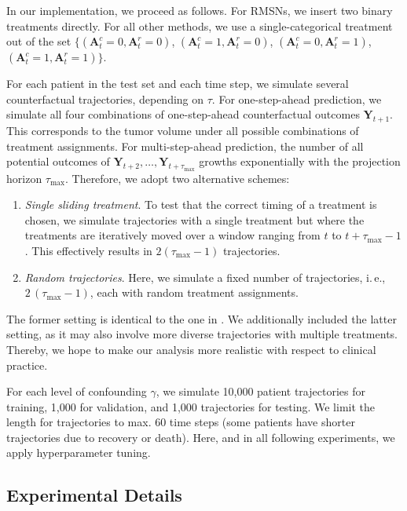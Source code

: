 \documentclass{article}
\newcommand\ie{i.\,e.\xspace}
\theoremstyle{plain}
\theoremstyle{definition}
\theoremstyle{remark}
\begin{document}
In our implementation, we proceed as follows. For RMSNs, we insert two binary treatments directly. For all other methods, we use a single-categorical treatment out of the set $\{(\mathbf{A}^c_t=0, \mathbf{A}^r_t=0)$, $(\mathbf{A}^c_t=1, \mathbf{A}^r_t=0)$, $(\mathbf{A}^c_t=0, \mathbf{A}^r_t=1)$, $(\mathbf{A}^c_t=1, \mathbf{A}^r_t=1 )\}$.

For each patient in the test set and each time step, we simulate several counterfactual trajectories, depending on $\tau$. For one-step-ahead prediction, we simulate all four combinations of one-step-ahead counterfactual outcomes $\mathbf{Y}_{t+1}$. This corresponds to the tumor volume under all possible combinations of treatment assignments. For multi-step-ahead prediction, the number of all potential outcomes of $\mathbf{Y}_{t+2}, \dots, \mathbf{Y}_{t+\tau_{\text{max}}}$ growths exponentially with the projection horizon $\tau_{\text{max}}$. Therefore, we adopt two alternative schemes:
\begin{enumerate}
\item \emph{Single sliding treatment}. To test that the correct timing of a treatment is chosen, we simulate trajectories with a single treatment but where the treatments are iteratively moved over a window ranging from $t$ to $t + \tau_{\text{max}} - 1$. This effectively results in $2(\tau_{\text{max}} - 1)$ trajectories. 
\item \emph{Random trajectories}. Here, we simulate a fixed number of trajectories, \ie, $2\,(\tau_{\text{max}} - 1)$, each with random treatment assignments. 
\end{enumerate} 
The former setting is identical to the one in \cite{bica2020estimating}. We additionally included the latter setting, as it may also involve more diverse trajectories with multiple treatments. Thereby, we hope to make our analysis more realistic with respect to clinical practice. 

For each level of confounding $\gamma$, we simulate 10,000 patient trajectories for training, 1,000 for validation, and 1,000 trajectories for testing. We limit the length for trajectories to max. 60 time steps (some patients have shorter trajectories due to recovery or death). Here, and in all following experiments, we apply hyperparameter tuning.

\subsection{Experimental Details}
\end{document}
